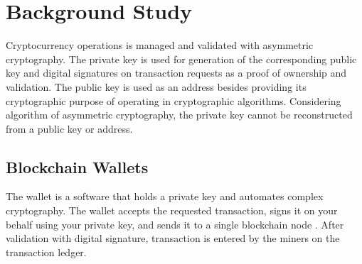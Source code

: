 \documentclass[conference]{IEEEtran}
\begin{document}

\section{Background Study}
Cryptocurrency operations is managed and validated with asymmetric cryptography. The private key is used for generation of the corresponding 
public key and digital signatures on transaction requests as a proof of ownership and validation. The public key is used as an address besides 
providing its cryptographic purpose of operating in cryptographic algorithms\cite{huhmo2018blockchain}. Considering algorithm of asymmetric 
cryptography, the private key cannot be reconstructed from a public key or address. 


\subsection{Blockchain Wallets}
The wallet is a software that holds a private key and automates complex cryptography. The wallet accepts the requested transaction, signs it 
on your behalf using your private key, and sends it to a single blockchain node \cite{julie2020blockchain}. After validation with digital 
signature, transaction is entered by the miners on the transaction ledger.

\end{document}
